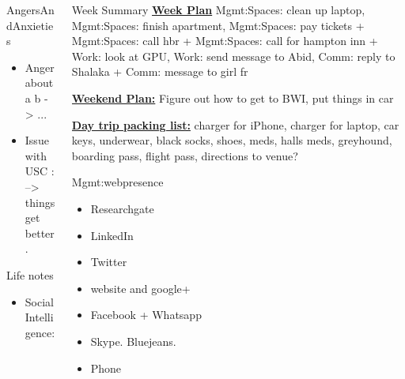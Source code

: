 \documentclass[serif, mathserif, final]{beamer}
\begin{document}
\begin{frame}
\begin{columns}
\begin{column}{0.25\linewidth}
\begin{block}{AngersAndAnxieties}
\begin{itemize}
        \item \tiny Anger about a b  -> ...
        \item \tiny Issue with USC : --> things get better. 
        \end{itemize}
      \end{block}
      \begin{block}{Life notes}
        \begin{itemize}
          \tiny \item \tiny Social Intelligence: 
        \end{itemize}
      \end{block}
    \end{column}



\begin{column}{0.5\linewidth}
 
  \begin{block}{Week Summary}
    {\tiny \underline{\bf Week Plan}
      Mgmt:Spaces: clean up laptop, Mgmt:Spaces: finish apartment,
      Mgmt:Spaces: pay tickets + Mgmt:Spaces: call hbr + Mgmt:Spaces:
      call for hampton inn + Work: look at GPU, Work: send message to Abid, Comm: reply to
      Shalaka + Comm: message to girl fr} 

    {\tiny \underline{\bf Weekend Plan:}} Figure out how to get to
    BWI, put things in car 

    {\underline{\bf Day trip packing list:} charger for iPhone,
      charger for laptop, car keys, underwear, black socks, shoes, meds, halls
      meds, greyhound, boarding pass, flight pass, directions to
      venue?}

    \begin{block}{Mgmt:webpresence}
      \begin{itemize} 
          \tiny \item \tiny Researchgate 
        \item \tiny LinkedIn 
        \item \tiny Twitter 
        \item \tiny website and google+ 
        \item \tiny Facebook + Whatsapp
        \item \tiny Skype.  Bluejeans. 
        \item \tiny Phone
        \end{itemize}
    \end{block}


\end{block}
\end{column}
\end{columns}
\end{frame}
\end{document}
